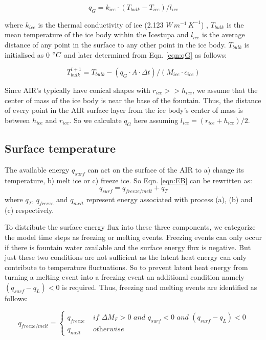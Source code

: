 \documentclass[utf8]{frontiersSCNS} %
\begin{document}
\begin{equation} q_{G} = k_{ice} \cdot (T_{bulk}-T_{ice})/l_{ice} \label{eqn:qG}    \end{equation}

where $k_{ice}$ is the thermal conductivity of ice (2.123 $W\, m^{-1}\,K^{-1}$) , $T_{bulk}$ is the mean temperature of
the ice body within the Icestupa and $l_{ice}$ is the average distance of any point in the surface to any other point in
the ice body. $T_{bulk}$ is initialised as 0 $\degree C$ and later determined from Eqn. \ref{eqn:qG} as follows:

\begin{equation} T_{bulk}^{i+1} = T_{bulk} - (q_{G} \cdot A \cdot \Delta t)/(M_{ice} \cdot c_{ice}) \end{equation}

Since AIR's typically have conical shapes with $r_{ice} >> h_{ice}$, we assume that the center of mass of the ice body
is near the base of the fountain. Thus, the distance of every point in the AIR surface layer from the ice body's center
of mass is between $h_{ice}$ and $r_{ice}$. So we calculate $q_{G}$ here assuming $l_{ice} = (r_{ice} + h_{ice})/2$.

\subsection{Surface temperature}
The available energy $q_{surf}$ can act on the surface of the AIR to a) change its temperature, b) melt ice or
c) freeze ice. So Eqn. \ref{eqn:EB} can be rewritten as: \begin{equation} q_{surf} = q_{freeze/melt} +
	q_{T} \end{equation}
where $q_{T}$, $q_{freeze}$ and $q_{melt}$ represent energy associated with process (a), (b) and (c) respectively.

To distribute the surface energy flux into these three components, we categorize the model time steps as freezing or
melting events. Freezing events can only occur if there is fountain water available and the surface energy flux is
negative. But just these two conditions are not sufficient as the latent heat energy can only contribute to temperature
fluctuations. So to prevent latent heat energy from turning a melting event into a freezing event an additional
condition namely $(q_{surf}-q_{L}) < 0$ is required. Thus, freezing and melting events are identified as follows:

\begin{equation}
	q_{freeze/melt} = \left\{ \begin{array}{ll}
		q_{freeze} & \textit{ if } \Delta M_{F} > 0 \textit{ and } q_{surf} < 0 \textit{ and }(q_{surf}-q_{L}) < 0 \\
		q_{melt}   & \textit{ otherwise}
	\end{array} \right.
\end{equation}
\end{document}
